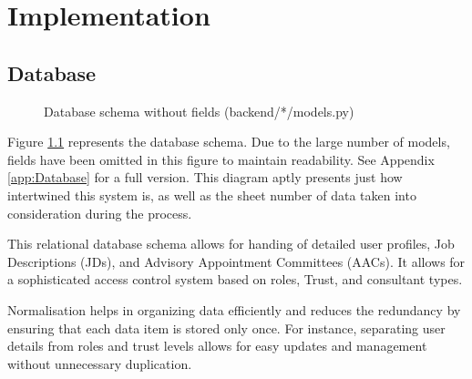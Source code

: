 \chapter{Implementation}
\section{Database} \label{Database}
\begin{figure}[h]
\centering
{}
\vspace{-20pt}
\caption{Database schema without fields (backend/*/models.py)}
\label{fig:database}
\vspace{-5pt}
\end{figure}
Figure \ref{fig:database} represents the database schema. Due to the large number of models, fields have been omitted in this figure to maintain readability. See Appendix \ref{app:Database} for a full version. This diagram aptly presents just how intertwined this system is, as well as the sheet number of data taken into consideration during the process.

This relational database schema allows for handing of detailed user profiles, Job Descriptions (JDs), and Advisory Appointment Committees (AACs). It allows for a sophisticated access control system based on roles, Trust, and consultant types. 

Normalisation helps in organizing data efficiently and reduces the redundancy by ensuring that each data item is stored only once. For instance, separating user details from roles and trust levels allows for easy updates and management without unnecessary duplication. 

